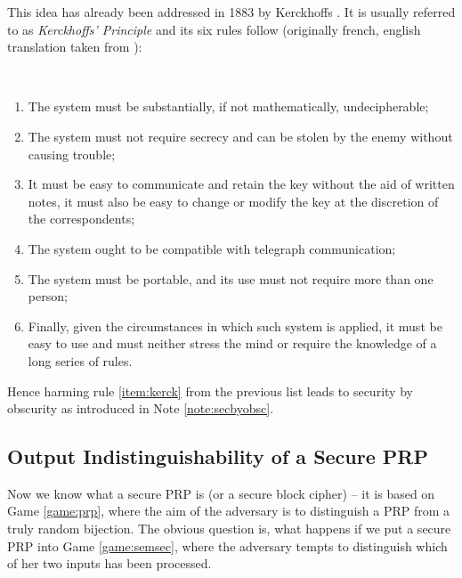 This idea has already been addressed in 1883 by Kerckhoffs \cite{auguste1883cryptographie}. It is usually referred to as {\em Kerckhoffs' Principle} and its six rules follow (originally french, english translation taken from \cite{petitcolas2016kerckhoffs}):
\begin{princ}[Kerckhoffs]
	~
	\begin{enumerate}
		\item The system must be substantially, if not mathematically, undecipherable;
		\item The system must not require secrecy and can be stolen by the enemy without causing trouble;\label{item:kerck}
		\item It must be easy to communicate and retain the key without the aid of written notes, it must also be easy to change or modify the key at the discretion of the correspondents;
		\item The system ought to be compatible with telegraph communication;
		\item The system must be portable, and its use must not require more than one person;
		\item Finally, given the circumstances in which such system is applied, it must be easy to use and must neither stress the mind or require the knowledge of a long series of rules.
	\end{enumerate}
\end{princ}
Hence harming rule \ref{item:kerck} from the previous list leads to security by obscurity as introduced in Note \ref{note:secbyobsc}.



\subsection{Output Indistinguishability of a Secure PRP}

Now we know what a secure PRP is (or a secure block cipher) -- it is based on Game \ref{game:prp}, where the aim of the adversary is to distinguish a PRP from a truly random bijection. The obvious question is, what happens if we put a secure PRP into Game \ref{game:semsec}, where the adversary tempts to distinguish which of her two inputs has been processed.


